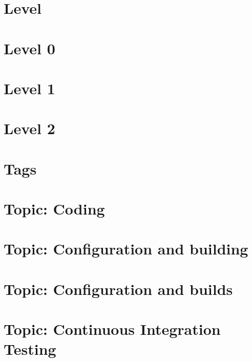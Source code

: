 \documentclass[twoside]{book}
\newcommand{\+}{\discretionary{\mbox{\scriptsize$\hookleftarrow$}}{}{}}
\begin{document}
\chapter{Level}
\label{md_markdown_level}

\chapter{Level 0}
\label{md_markdown_level0}

\chapter{Level 1}
\label{md_markdown_level1}

\chapter{Level 2}
\label{md_markdown_level2}

\chapter{Tags}
\label{md_markdown_tags}

\chapter{Topic\+: Coding}
\label{md_markdown_topic_coding}

\chapter{Topic\+: Configuration and building}
\label{md_markdown_topic_configuration_and_building}

\chapter{Topic\+: Configuration and builds}
\label{md_markdown_topic_configuration_and_builds}

\chapter{Topic\+: Continuous Integration Testing}
\label{md_markdown_topic_continuous_integration_testing}

\end{document}
